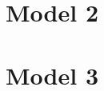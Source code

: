 \documentclass[11pt]{article}
\begin{document}
\section{Model 2}






\section{Model 3}





\end{document}

